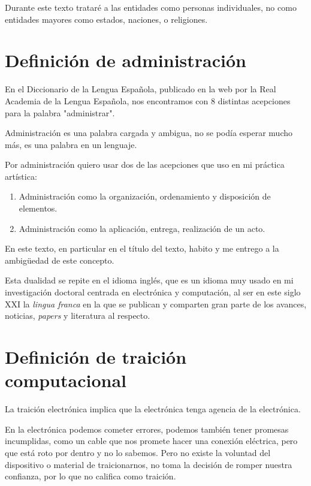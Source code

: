\documentclass{article}
\begin{document}
Durante este texto trataré a las entidades como personas individuales, no como entidades mayores como estados, naciones, o religiones.

\clearpage

\section{Definición de administración}

En el Diccionario de la Lengua Española, publicado en la web por la Real Academia de la Lengua Española, nos encontramos con 8 distintas acepciones para la palabra "administrar"\cite{administrar}.

Administración es una palabra cargada y ambigua, no se podía esperar mucho más, es una palabra en un lenguaje.

Por administración quiero usar dos de las acepciones que uso en mi práctica artística:

\begin{enumerate}
    \item Administración como la organización, ordenamiento y disposición de elementos.
    \item Administración como la aplicación, entrega, realización de un acto.
\end{enumerate}

En este texto, en particular en el título del texto, habito y me entrego a la ambigüedad de este concepto.

Esta dualidad se repite en el idioma inglés, que es un idioma muy usado en mi investigación doctoral centrada en electrónica y computación, al ser en este siglo XXI la \textit{lingua franca} en la que se publican y comparten gran parte de los avances, noticias, \textit{papers} y literatura al respecto.

\clearpage

\section{Definición de traición computacional}

La traición electrónica implica que la electrónica tenga agencia de la electrónica.

En la electrónica podemos cometer errores, podemos también tener promesas incumplidas, como un cable que nos promete hacer una conexión eléctrica, pero que está roto por dentro y no lo sabemos. Pero no existe la voluntad del dispositivo o material de traicionarnos, no toma la decisión de romper nuestra confianza, por lo que no califica como traición.
\end{document}
